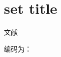 \documentclass[twoside]{article}
\begin{document}
    \section{set title}

	文献

    \setcounter{charcode}{`文}
    编码为：\thecharcode


    
\end{document}
